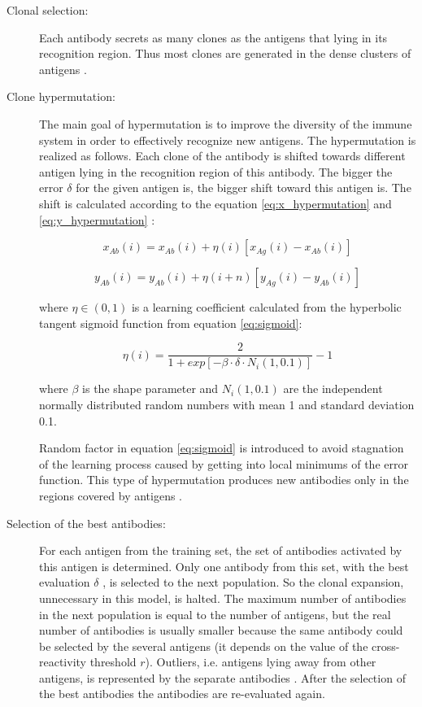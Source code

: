 \documentclass{assignment}
\begin{document}
\begin{description}
\begin{description}

\item[Clonal selection:] Each antibody secrets as many clones as the antigens that lying in its recognition region. Thus most clones are generated in the dense clusters of antigens \cite{AIS_STLF08}.

\item[Clone hypermutation:] The main goal of hypermutation is to improve the diversity of the immune system in order to effectively recognize new antigens. The hypermutation is realized as follows. Each clone of the antibody is shifted towards different antigen lying in the recognition region of this antibody. The bigger the error $\delta$ for the given antigen is, the bigger shift toward this antigen is. The shift is calculated according to the equation \eqref{eq:x_hypermutation} and \eqref{eq:y_hypermutation} \cite{AIS_STLF08}:

\begin{equation}
x_{Ab}(i) = x_{Ab}(i) + \eta(i)[x_{Ag}(i)-x_{Ab}(i)]
\label{eq:x_hypermutation}
\end{equation}

\begin{equation}
y_{Ab}(i) =y_{Ab}(i) + \eta(i+n)[y_{Ag}(i)-y_{Ab}(i)]
\label{eq:y_hypermutation}
\end{equation}

where $\eta \in (0, 1)$ is a learning coefficient calculated from the hyperbolic tangent sigmoid function from equation \eqref{eq:sigmoid}:

\begin{equation}
\eta(i) = \frac{2}{1+exp[-\beta \cdot \delta \cdot N_i(1,0.1)]} -1
\label{eq:sigmoid}
\end{equation}

where $\beta$ is the shape parameter and $N_i (1, 0.1)$ are the independent normally distributed random numbers with mean 1 and standard deviation 0.1.

Random factor in equation \eqref{eq:sigmoid} is introduced to avoid stagnation of the learning process caused by getting into local minimums of the error function. This type of hypermutation produces new antibodies only in the regions covered by antigens \cite{AIS_STLF08}.

\item[Selection of the best antibodies:] For each antigen from the training set, the set of antibodies activated by this antigen is determined. Only one antibody from this set, with the best evaluation $\delta$ , is selected to the next population. So the clonal expansion, unnecessary in this model, is halted. The maximum number of antibodies in the next population is equal to the number of antigens, but the real number of antibodies is usually smaller because the same antibody could be selected by the several antigens (it depends on the value of the cross-reactivity threshold $r$). Outliers, i.e. antigens lying away from other antigens, is represented by the separate antibodies \cite{AIS_STLF08}. After the selection of the best antibodies the antibodies are re-evaluated again.


\end{description}
\end{description}
\end{document}
